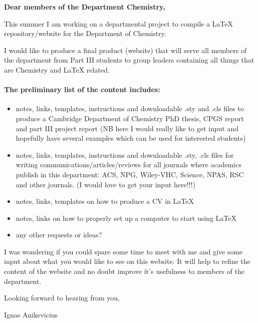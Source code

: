 \documentclass[a4paper]{article}
\begin{document}
\thispagestyle{empty}

{\large \bfseries Dear members of the Department Chemistry,}
    
This summer I am working on a departmental project to compile a LaTeX repository/website for the
Department of Chemistry.

I would like to produce a final product (website) that will serve all members of the department from
Part III students to group leaders containing all things that are Chemistry and LaTeX related.

\paragraph{The preliminary list of the content includes:}

\begin{itemize}
    \item notes, links, templates, instructions and downloadable .sty and .cls files to produce a
        Cambridge Department of Chemistry PhD thesis, CPGS report and part III project report (NB
        here I would really like to get input and hopefully have several examples which can be used
        for interested students)

    \item notes, links, templates, instructions and downloadable .sty, .cls files for writing
        communications/articles/reviews for all journals where academics publish in this department:
        ACS, NPG, Wiley-VHC, Science, NPAS, RSC and other journals.  (I would love to get your input
        here!!!)

    \item notes, links, templates on how to produce a CV in LaTeX 

    \item notes, links on how to properly set up a computer to start using LaTeX 

    \item any other requests or ideas?
\end{itemize}

I was wondering if you could spare some time to meet with me and give some input about what you
would like to see on this website. It will help to refine the content of the website and no doubt
improve it's usefulness to members of the department.

Looking forward to hearing from you,

\hfill        Ignas Anikevicius
\end{document}
